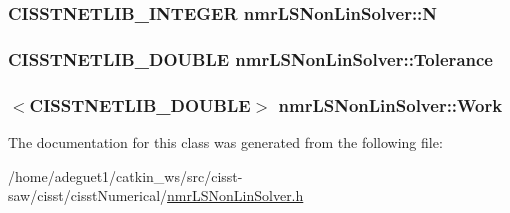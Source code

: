 \hypertarget{classnmr_l_s_non_lin_solver_a5ee3cc88525a1b1f9749729b676135fe}{
\subsubsection[{N}]{\setlength{\rightskip}{0pt plus 5cm}C\-I\-S\-S\-T\-N\-E\-T\-L\-I\-B\-\_\-\-I\-N\-T\-E\-G\-E\-R nmr\-L\-S\-Non\-Lin\-Solver\-::\-N\hspace{0.3cm}{\ttfamily [protected]}}}\label{classnmr_l_s_non_lin_solver_a5ee3cc88525a1b1f9749729b676135fe}
\hypertarget{classnmr_l_s_non_lin_solver_a4becb9d9f32e92e2bd373a353ddb7b81}{
\subsubsection[{Tolerance}]{\setlength{\rightskip}{0pt plus 5cm}C\-I\-S\-S\-T\-N\-E\-T\-L\-I\-B\-\_\-\-D\-O\-U\-B\-L\-E nmr\-L\-S\-Non\-Lin\-Solver\-::\-Tolerance\hspace{0.3cm}{\ttfamily [protected]}}}\label{classnmr_l_s_non_lin_solver_a4becb9d9f32e92e2bd373a353ddb7b81}
\hypertarget{classnmr_l_s_non_lin_solver_a7ba55974c126ea40c19938c09c6ac730}{
\subsubsection[{Work}]{$<$C\-I\-S\-S\-T\-N\-E\-T\-L\-I\-B\-\_\-\-D\-O\-U\-B\-L\-E$>$ nmr\-L\-S\-Non\-Lin\-Solver\-::\-Work\hspace{0.3cm}{\ttfamily [protected]}}}\label{classnmr_l_s_non_lin_solver_a7ba55974c126ea40c19938c09c6ac730}


The documentation for this class was generated from the following file\-:\begin{DoxyCompactItemize}
\item 
/home/adeguet1/catkin\-\_\-ws/src/cisst-\/saw/cisst/cisst\-Numerical/\hyperlink{nmr_l_s_non_lin_solver_8h}{nmr\-L\-S\-Non\-Lin\-Solver.\-h}\end{DoxyCompactItemize}

